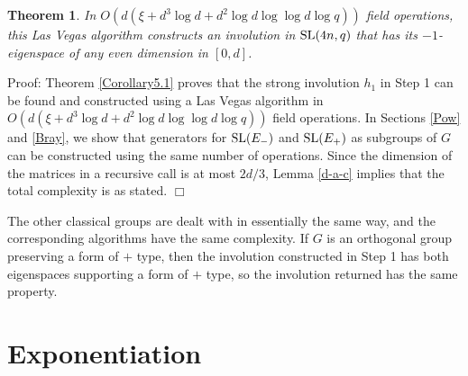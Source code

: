 \documentclass[12pt]{article}
\newtheorem{theorem}[definition]{Theorem}
\newenvironment{proof}{\normalsize {\sc Proof}:}{{\hfill $\Box$ \\}}
\def\SL{{\rm SL}}
\def\Oh{O}  %
\begin{document}
\begin{theorem}\label{Corollary5.2}  
In $\Oh(d(\xi + d^3 \log d + d^2 \log d\log\log d \log q))$ field operations, 
this Las Vegas algorithm constructs an involution in $\SL(4n,q)$ 
that has its $-1$-eigenspace of any even dimension in $[0,d]$.
\end{theorem}
\begin{proof}
Theorem \ref{Corollary5.1}
proves that the strong involution $h_1$ in Step 1 can be 
found and constructed using a Las Vegas algorithm in 
$\Oh(d(\xi + d^3 \log d + d^2 \log d\log \log d \log q))$ field operations. 
In Sections \ref{Pow} and \ref{Bray}, we show 
that generators for $\SL(E_-)$ and $\SL(E_+)$ as
subgroups of $G$ can be constructed using the same  
number of operations. 
Since the dimension of the matrices
in a recursive call is at most $2d/3$, Lemma \ref{d-a-c} implies that 
the total complexity is as stated.
\end{proof}

The other classical groups are dealt with in essentially the same way, 
and the corresponding algorithms have the same complexity.
If $G$ is an orthogonal group preserving a form of $+$ type, 
then the involution constructed in Step 1 has 
both eigenspaces supporting a form of $+$ type, so the involution returned 
has the same property.

\section{Exponentiation}
\label{Exp}
\end{document}

